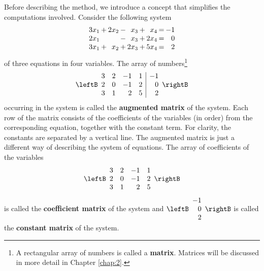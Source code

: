 Before describing the method, we introduce a concept that simplifies the computations involved. Consider the following system
\begin{equation*}
\arraycolsep=1pt
\begin{array}{rlrlrlrcr}
	3x_1 & + & 2x_2 & - &  x_3 & + &  x_4 & = & -1\\
	2x_1 &   &      & - &  x_3 & + & 2x_4 & = & 0\\
	3x_1 & + &  x_2 & + & 2x_3 & + & 5x_4 & = & 2
\end{array}
\end{equation*}
of three equations in four variables. The array of numbers\footnote{A rectangular array of numbers is called a \textbf{matrix}. Matrices will be discussed in more detail in Chapter \ref{chap:2}.}
\begin{equation*}
\leftB \begin{array}{rrrr|r}
3 & 2 & -1 & 1 & -1 \\
2 & 0 & -1 & 2 & 0 \\
3 & 1 & 2 & 5 & 2
\end{array} \rightB
\end{equation*}
occurring in the system is called the \textbf{augmented matrix} of the system. Each row of the matrix consists of the coefficients of the variables (in order) from the corresponding equation, together with the constant term. For clarity, the constants are separated by a vertical line. The augmented matrix is just a different way of describing the system of equations. The array of coefficients of the variables
\begin{equation*}
\leftB \begin{array}{rrrr}
3 & 2 & -1 & 1 \\
2 & 0 & -1 & 2 \\
3 & 1 & 2 & 5 
\end{array} \rightB
\end{equation*}
is called the \textbf{coefficient matrix} of the system and 
$ \leftB \begin{array}{r} 
-1 \\
0 \\
2
\end{array} \rightB
$ is called the \textbf{constant matrix} of the system.

